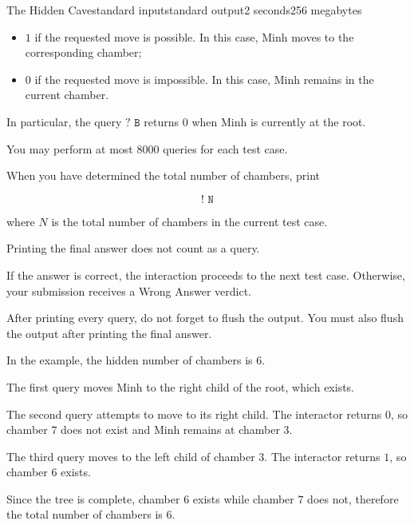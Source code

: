 \begin{problem}{The Hidden Cave}{standard input}{standard output}{2 seconds}{256 megabytes}
\begin{itemize}
\item $1$ if the requested move is possible. In this case, Minh moves to the corresponding chamber;
\item $0$ if the requested move is impossible. In this case, Minh remains in the current chamber.
\end{itemize}

In particular, the query $\texttt{? B}$ returns $0$ when Minh is currently at the root.

You may perform at most $8000$ queries for each test case.

When you have determined the total number of chambers, print

$$\texttt{! N}$$

where $N$ is the total number of chambers in the current test case.

Printing the final answer does not count as a query.

If the answer is correct, the interaction proceeds to the next test case. Otherwise, your submission receives a Wrong Answer verdict.

After printing every query, do not forget to flush the output. You must also flush the output after printing the final answer.

\Example

\begin{example}
%
\end{example}

\Note
In the example, the hidden number of chambers is $6$.

The first query moves Minh to the right child of the root, which exists.

The second query attempts to move to its right child. The interactor returns $0$, so chamber $7$ does not exist and Minh remains at chamber $3$.

The third query moves to the left child of chamber $3$. The interactor returns $1$, so chamber $6$ exists.

Since the tree is complete, chamber $6$ exists while chamber $7$ does not, therefore the total number of chambers is $6$.

\end{problem}

